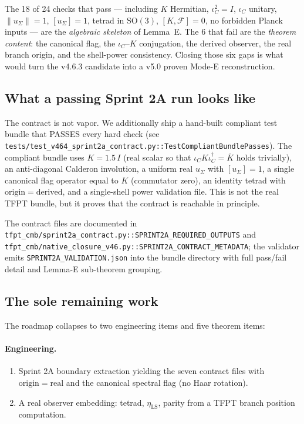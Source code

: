 \documentclass[11pt,a4paper]{article}
\begin{document}
\begin{tfptfrontbox}
The 18 of 24 checks that pass --- including \(K\) Hermitian,
\(\iota_C^2=I\), \(\iota_C\) unitary, \(\|u_\Sigma\|=1\),
\([u_\Sigma]=1\), tetrad in \(\mathrm{SO}(3)\), \([K, \mathcal F]=0\),
no forbidden Planck inputs --- are the \emph{algebraic skeleton} of
Lemma~E.  The 6 that fail are the \emph{theorem content}: the canonical
flag, the \(\iota_C\)--\(K\) conjugation, the derived observer, the
real branch origin, and the shell-power consistency.  Closing those
six gaps is what would turn the v4.6.3 candidate into a v5.0 proven
Mode-E reconstruction.
\end{tfptfrontbox}

\subsection{What a passing Sprint 2A run looks like}

The contract is not vapor.  We additionally ship a hand-built compliant
test bundle that PASSES every hard check (see
\texttt{tests/test\_v464\_sprint2a\_contract.py::TestCompliantBundlePasses}).
The compliant bundle uses
\(K=1.5\,I\) (real scalar so that
\(\iota_C K \iota_C^\dagger=\overline{K}\) holds trivially), an
anti-diagonal Calderon involution, a uniform real \(u_\Sigma\) with
\([u_\Sigma]=1\), a single canonical flag operator equal to
\(K\) (commutator zero), an identity tetrad with
\(\mathrm{origin}=\mathrm{derived}\), and a single-shell power
validation file.  This is not the real TFPT bundle, but it proves
that the contract is reachable in principle.

The contract files are documented in
\texttt{tfpt\_cmb/sprint2a\_contract.py::SPRINT2A\_REQUIRED\_OUTPUTS}
and
\texttt{tfpt\_cmb/native\_closure\_v46.py::SPRINT2A\_CONTRACT\_METADATA};
the validator emits \texttt{SPRINT2A\_VALIDATION.json} into the bundle
directory with full pass/fail detail and Lemma-E sub-theorem grouping.

\subsection{The sole remaining work}

The roadmap collapses to two engineering items and five theorem items:

\paragraph{Engineering.}
\begin{enumerate}[leftmargin=1.4em]
\item Sprint 2A boundary extraction yielding the seven contract
files with \(\mathrm{origin}=\mathrm{real}\) and the canonical
spectral flag (no Haar rotation).
\item A real observer embedding: tetrad, \(\eta_{\mathrm{LS}}\),
parity from a TFPT branch position computation.
\end{enumerate}
\end{document}
